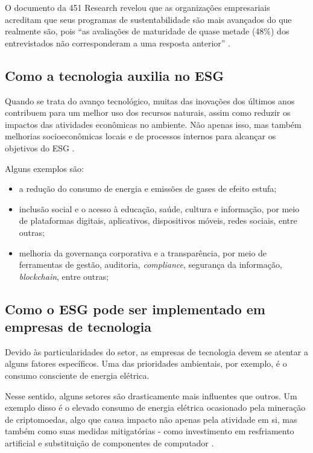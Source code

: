 \documentclass[12pt]{article}
\begin{document}
	O documento da 451 Research revelou que as organizações empresariais acreditam que seus programas de sustentabilidade são mais avançados do que realmente são, pois “as avaliações de maturidade de quase metade (48\%) dos entrevistados não corresponderam a uma resposta anterior” \cite{paceteESGPrioridadePara2022}.
	
	\subsection*{Como a tecnologia auxilia no ESG}
	
	Quando se trata do avanço tecnológico, muitas das inovações dos últimos anos contribuem para um melhor uso dos recursos naturais, assim como reduzir os impactos das atividades econômicas no ambiente. Não apenas isso, mas também melhorias socioeconômicas locais e de processos internos para alcançar os objetivos do ESG \cite{cabralPraticasESGAplicadas2023}.
	
	Alguns exemplos são:
	
	\begin{itemize}
		\item a redução do consumo de energia e emissões de gases de efeito estufa;
		\item inclusão social e o acesso à educação, saúde, cultura e informação, por meio de plataformas digitais, aplicativos, dispositivos móveis, redes sociais, entre outras;
		\item melhoria da governança corporativa e a transparência, por meio de ferramentas de gestão, auditoria, \emph{compliance}, segurança da informação, \emph{blockchain}, entre outras;
	\end{itemize}
	
	\subsection*{Como o ESG pode ser implementado em empresas de tecnologia}
	
	Devido às particularidades do setor, as empresas de tecnologia devem se atentar a alguns fatores específicos. Uma das prioridades ambientais, por exemplo, é o consumo consciente de energia elétrica.
	
	Nesse sentido, alguns setores são drasticamente mais influentes que outros. Um exemplo disso é o elevado consumo de energia elétrica ocasionado pela mineração de criptomoedas, algo que causa impacto não apenas pela atividade em si, mas também como suas medidas mitigatórias - como investimento em resfriamento artificial e substituição de componentes de computador \cite{kohliAnalysisEnergyConsumption2023}.
	
\end{document}
